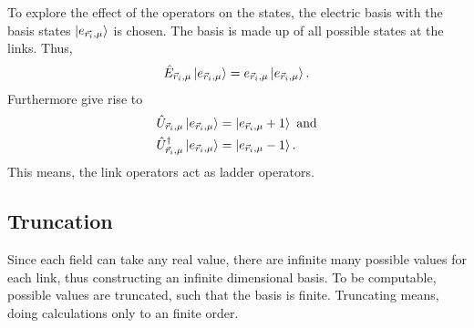 To explore the effect of the operators on the states, the electric basis with the basis states $\ket{e_{\vec{r_i}, \mu}}$ is chosen. The basis is made up of all possible states at the links. Thus,
\begin{align}
  \hat{E}_{\vec{r}_{i}, \mu}\ket{e_{\vec{r}_{i}, \mu}}=e_{\vec{r}_{i}, \mu}\ket{e_{\vec{r}_{i}, \mu}}.\label{eq:eig}
\end{align}
Furthermore  give rise to 
\begin{align}
  \hat{U}_{\vec{r}_{i}, \mu}\ket{e_{\vec{r}_{i}, \mu}}      & =\ket{e_{\vec{r}_{i}, \mu}+1}\text{ and}\label{eq:eigu1} \\
  \hat{U}_{\vec{r}_{i}, \mu}^\dag\ket{e_{\vec{r}_{i}, \mu}} & =\ket{e_{\vec{r}_{i}, \mu}-1}.\label{eq:eigu2}
\end{align}
This means, the link operators act as ladder operators.
\subsection{Truncation}
Since each field can take any real value, there are infinite many possible values for each link, thus constructing an infinite dimensional basis. To be computable, possible values are truncated, such that the basis is finite. Truncating means, doing calculations only to an finite order.

